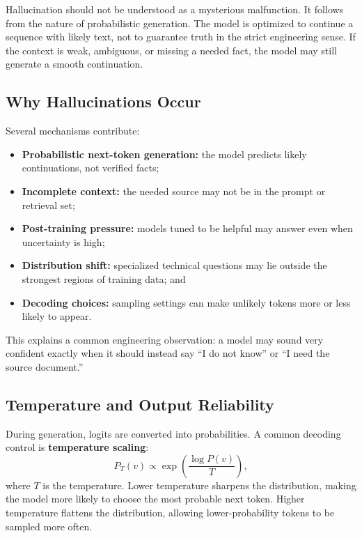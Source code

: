 \documentclass[12pt]{article}
\begin{document}
Hallucination should not be understood as a mysterious malfunction. It follows from the nature of probabilistic generation. The model is optimized to continue a sequence with likely text, not to guarantee truth in the strict engineering sense. If the context is weak, ambiguous, or missing a needed fact, the model may still generate a smooth continuation.

\subsection{Why Hallucinations Occur}

Several mechanisms contribute:
\begin{itemize}
    \item \textbf{Probabilistic next-token generation:} the model predicts likely continuations, not verified facts;
    \item \textbf{Incomplete context:} the needed source may not be in the prompt or retrieval set;
    \item \textbf{Post-training pressure:} models tuned to be helpful may answer even when uncertainty is high;
    \item \textbf{Distribution shift:} specialized technical questions may lie outside the strongest regions of training data; and
    \item \textbf{Decoding choices:} sampling settings can make unlikely tokens more or less likely to appear.
\end{itemize}

This explains a common engineering observation: a model may sound very confident exactly when it should instead say ``I do not know'' or ``I need the source document.''

\subsection{Temperature and Output Reliability}

During generation, logits are converted into probabilities. A common decoding control is \textbf{temperature scaling}:
\begin{equation}
    P_T(v) \propto \exp\!\left(\frac{\log P(v)}{T}\right),
    \label{t15eq:temperature}
\end{equation}
where $T$ is the temperature. Lower temperature sharpens the distribution, making the model more likely to choose the most probable next token. Higher temperature flattens the distribution, allowing lower-probability tokens to be sampled more often.
\end{document}
